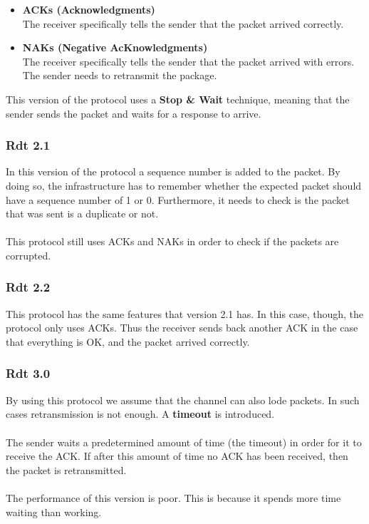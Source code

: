 \documentclass{article}
\begin{document}
\begin{itemize}
	\item \textbf{ACKs (Acknowledgments)}
	\vspace{.2cm} \\
	The receiver specifically tells the sender that the packet arrived correctly.
	
	\item \textbf{NAKs (Negative AcKnowledgments)}
	\vspace{.2cm} \\
	The receiver specifically tells the sender that the packet arrived with errors. The sender needs to retransmit the package.
\end{itemize}
This version of the protocol uses a \textbf{Stop \& Wait} technique, meaning that the sender sends the packet and waits for a response to arrive.

\subsubsection{Rdt 2.1}
In this version of the protocol a sequence number is added to the packet. By doing so, the infrastructure has to remember whether the expected packet should have a sequence number of 1 or 0. Furthermore, it needs to check is the packet that was sent is a duplicate or not.  \\ \\
This protocol still uses ACKs and NAKs in order to check if the packets are corrupted.

\subsubsection{Rdt 2.2}
This protocol has the same features that version 2.1 has. In this case, though, the protocol only uses ACKs. Thus the receiver sends back another ACK in the case that everything is OK, and the packet arrived correctly.

\subsubsection{Rdt 3.0}
By using this protocol we assume that the channel can also lode packets. In such cases retransmission is not enough. A \textbf{timeout} is introduced. \\ \\
The sender waits a predetermined amount of time (the timeout) in order for it to receive the ACK. If after this amount of time no ACK has been received, then the packet is retransmitted. \\ \\ 
The performance of this version is poor. This is because it spends more time waiting than working.
\end{document}
